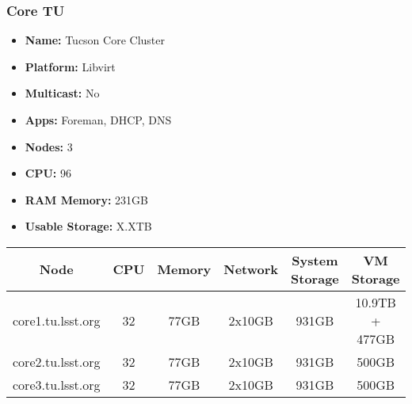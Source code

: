 \newpage
\subsubsection{Core TU}
\begin{itemize}
  \itemsep0em 
  \item \textbf{Name:}       Tucson Core Cluster
  \item \textbf{Platform:}   Libvirt
  \item \textbf{Multicast:}  No
  \item \textbf{Apps:}       Foreman, DHCP, DNS
  \item \textbf{Nodes:}      3
  \item \textbf{CPU:}        96
  \item \textbf{RAM Memory:} 231GB
  \item \textbf{Usable Storage:} X.XTB
\end{itemize}
\begin{center}
  \small
  \begin{tabular}{||c c c c c c||}
    \hline
    \textbf{Node} & \textbf{CPU} & \textbf{Memory} & \textbf{Network} & \textbf{System Storage} & \textbf{VM Storage} \\ [0.5ex]
    \hline
    core1.tu.lsst.org & 32 & 77GB & 2x10GB & 931GB & 10.9TB + 477GB \\
    \hline
    core2.tu.lsst.org & 32 & 77GB & 2x10GB & 931GB & 500GB \\
    \hline
    core3.tu.lsst.org & 32 & 77GB & 2x10GB & 931GB & 500GB \\
    \hline
  \end{tabular}
\end{center}